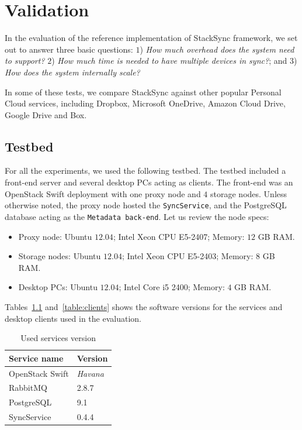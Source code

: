 \chapter{Validation}

In the evaluation of the reference implementation of StackSync framework, we set out to answer three basic questions: 
$1$) \textit{How much overhead does the system need to support?} $2$) \textit{How much time is needed to have multiple devices in sync?}; and 
$3$) \textit{How does the system internally scale?}

In some of these tests, we compare StackSync against other popular Personal Cloud services, including Dropbox, Microsoft OneDrive, Amazon Cloud Drive, Google Drive and Box.

\section{Testbed}

For all the experiments, we used the following testbed. The testbed included a front-end server and several desktop 
PCs acting as clients. The front-end was an OpenStack Swift deployment with one proxy node and $4$ storage nodes.  
Unless otherwise noted, the proxy node hosted the \texttt{SyncService}, and the PostgreSQL database acting as the \texttt{Metadata back-end}. Let us review the node specs:
\begin{itemize}
\item Proxy node: Ubuntu $12.04$; Intel Xeon CPU E5-2407; Memory: $12$ GB RAM.
\item Storage nodes: Ubuntu $12.04$;  Intel Xeon CPU E5-2403; Memory: $8$ GB RAM.
\item Desktop PCs: Ubuntu $12.04$; Intel Core i5 2400; Memory: $4$ GB RAM.
\end{itemize}

Tables~\ref{table:services} and~\ref{table:clients} shows the software versions for the services and desktop clients used in the evaluation.

\begin{table}[h]
    \centering
    \begin{tabular}{ | l | l | }
    \hline
    Service name & Version \\ \hline
    OpenStack Swift & \textit{Havana} \\
    RabbitMQ & 2.8.7 \\
    PostgreSQL & 9.1 \\
    SyncService & 0.4.4 \\ \hline
    \end{tabular}
    \caption{Used services version}
    \label{table:services}
\end{table}

